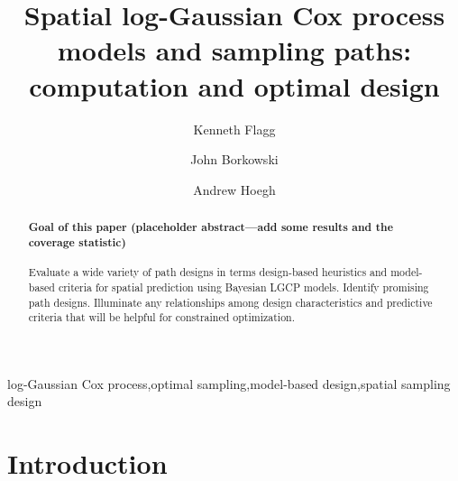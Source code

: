 \documentclass[review]{elsarticle}
\begin{document}
\begin{frontmatter}

\title{Spatial log-Gaussian Cox process models and sampling paths: computation and optimal design}

\author[msuaddr]{Kenneth Flagg}

\author[msuaddr]{John Borkowski}
\author[msuaddr]{Andrew Hoegh}

\address[msuaddr]{Department of Mathematical Sciences, Montana State University, Bozeman, MT 59717}

\begin{abstract}

\paragraph{Goal of this paper (placeholder abstract---add some results and the
coverage statistic)} Evaluate a wide variety of path designs in terms
design-based heuristics and model-based criteria for spatial prediction using
Bayesian LGCP models. Identify promising path designs. Illuminate any
relationships among design characteristics and predictive criteria that will be
helpful for constrained optimization.

\end{abstract}

\begin{keyword}
log-Gaussian Cox process\sep optimal sampling\sep model-based design\sep spatial sampling design
\end{keyword}

\end{frontmatter}

\linenumbers



\section{Introduction}
\end{document}
